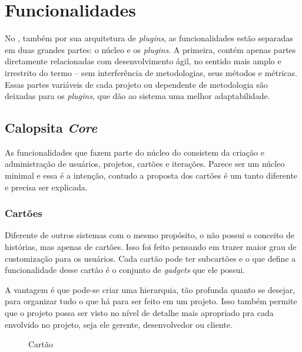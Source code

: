 \section{Funcionalidades}

No \calopsita{}, também por sua arquitetura de \textit{plugins}, as funcionalidades estão separadas em duas grandes partes: o núcleo e os \textit{plugins}. A primeira, contém apenas partes diretamente relacionadas com desenvolvimento ágil, no sentido mais amplo e irrestrito do termo -- sem interferência de metodologias, seus métodos e métricas. Essas partes variáveis de cada projeto ou dependente de metodologia são deixadas para os \textit{plugins}, que dão ao sistema uma melhor adaptabilidade.

\subsection{Calopsita \textit{Core}}

As funcionalidades que fazem parte do núcleo do \calopsita{} consistem da criação e administração de usuários, projetos, cartões e iterações. Parece ser um núcleo minimal e essa é a intenção, contudo a proposta dos cartões é um tanto diferente e precisa ser explicada.

\subsubsection*{Cartões}

Diferente de outros sistemas com o mesmo propósito, o \calopsita{} não possui o conceito de histórias, mas apenas de cartões. Isso foi feito pensando em trazer maior grau de customização para os usuários. Cada cartão pode ter subcartões e o que define a funcionalidade desse cartão é o conjunto de \textit{gadgets} que ele possui. 

A vantagem é que pode-se criar uma hierarquia, tão profunda quanto se desejar, para organizar tudo o que há para ser feito em um projeto. Isso também permite que o projeto possa ser visto no nível de detalhe mais apropriado pra cada envolvido no projeto, seja ele gerente, desenvolvedor ou cliente. 

\begin{figure}[H]
  \centering
  \caption{Cartão}\label{figura:cartao}
\end{figure}

